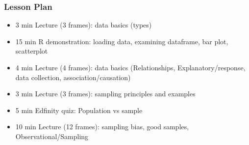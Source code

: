\begin{frame}
    \frametitle{Lesson Plan}
    \begin{itemize}
        \item 3 min Lecture (3 frames): data basics (types)
        \item 15 min R demonstration: loading data, examining dataframe, bar plot, scatterplot
        \item 4 min Lecture (4 frames): data basics (Relationships, Explanatory/response, data collection, association/causation)
        \item 3 min Lecture (3 frames): sampling principles and examples
        \item 5 min Edfinity quiz: Population vs sample
        \item 10 min Lecture (12 frames): sampling bias, good samples, Observational/Sampling
    \end{itemize}
\end{frame}
    
